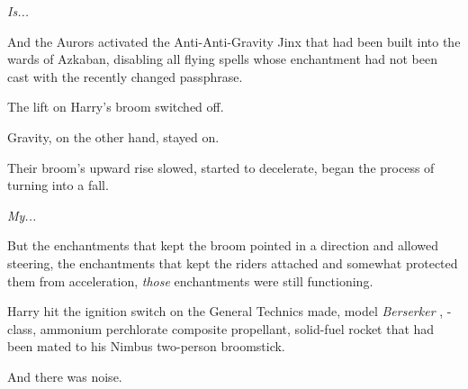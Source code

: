 \emph{Is...}

And the Aurors activated the Anti-Anti-Gravity Jinx that had been built into the wards of Azkaban, disabling all flying spells whose enchantment had not been cast with the recently changed passphrase.

The lift on Harry’s broom switched off.

Gravity, on the other hand, stayed on.

Their broom’s upward rise slowed, started to decelerate, began the process of turning into a fall.

\emph{My...}

But the enchantments that kept the broom pointed in a direction and allowed steering, the enchantments that kept the riders attached and somewhat protected them from acceleration, \emph{those} enchantments were still functioning.


Harry hit the ignition switch on the General Technics made, model \emph{Berserker }, -class, ammonium perchlorate composite propellant, solid-fuel rocket that had been mated to his Nimbus  two-person broomstick.

And there was noise.

